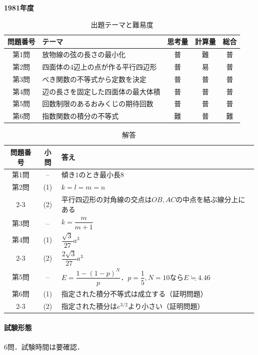 \documentclass[../../main.tex]{subfiles}
\begin{document}
\begin{center}
  {\fontsize{48pt}{58pt}\selectfont \textbf{1981}\normalsize\textbf{年度}}
\end{center}

\begin{table}[htb]
  \centering
  \caption{出題テーマと難易度}
  \begin{tabular}{|c|p{6.2cm}|c|c|c|}
    \hline
    \textbf{問題番号} & \textbf{テーマ} & \textbf{思考量} & \textbf{計算量} & \textbf{総合} \\
    \hline
    第1問 & 放物線の弦の長さの最小化 & 普 & 難 & 普 \\
    \hline
    第2問 & 四面体の4辺上の点が作る平行四辺形 & 普 & 易 & 普 \\
    \hline
    第3問 & べき関数の不等式から定数を決定 & 普 & 普 & 普 \\
    \hline
    第4問 & 辺の長さを固定した四面体の最大体積 & 普 & 普 & 普 \\
    \hline
    第5問 & 回数制限のあるおみくじの期待回数 & 普 & 普 & 普 \\
    \hline
    第6問 & 指数関数の積分の不等式 & 難 & 普 & 難 \\
    \hline
  \end{tabular}
\end{table}

\begin{table}[htb]
  \centering
  \caption{解答}
  \renewcommand{\arraystretch}{1.4}
  \begin{tabular}{|c|c|p{9cm}|}
    \hline
    \textbf{問題番号} & \textbf{小問} & \textbf{答え} \\
    \hline
    第1問 & -- & 傾き$1$のとき最小長$8$ \\
    \hline
    第2問 & (1) & $k=l=m=n$ \\
    \cline{2-3}
    & (2) & 平行四辺形の対角線の交点は$OB,AC$の中点を結ぶ線分上にある \\
    \hline
    第3問 & -- & $k=\dfrac{m}{m+1}$ \\
    \hline
    第4問 & (1) & $\dfrac{\sqrt{3}}{27}a^3$ \\
    \cline{2-3}
    & (2) & $\dfrac{2\sqrt{3}}{27}a^3$ \\
    \hline
    第5問 & -- & $E=\dfrac{1-(1-p)^N}{p}$．$p=\dfrac{1}{5},N=10$なら$E\fallingdotseq4.46$ \\
    \hline
    第6問 & (1) & 指定された積分不等式は成立する（証明問題） \\
    \cline{2-3}
    & (2) & 指定された積分は$e^{3/2}$より小さい（証明問題） \\
    \hline
  \end{tabular}
\end{table}

\paragraph{試験形態}
6問．試験時間は要確認．
\end{document}
